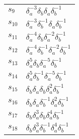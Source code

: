 \documentclass{article}
\begin{document}
\begin{center}
\begin{tabular}{ll}
$s_{9}$ & $\delta_a^{-3}\delta_b^{}\delta_a^{}\delta_b^{-1}$ \\
$s_{10}$ & $\delta_a^{-3}\delta_b^{-1}\delta_a^{}\delta_b^{-1}$ \\
$s_{11}$ & $\delta_a^{-4}\delta_b^{}\delta_a^{-2}\delta_b^{-1}$ \\
$s_{12}$ & $\delta_a^{-4}\delta_b^{-1}\delta_a^{-2}\delta_b^{-1}$ \\
$s_{13}$ & $\delta_a^{5}\delta_b^{}\delta_a^{-5}\delta_b^{-1}$ \\
$s_{14}$ & $\delta_a^{5}\delta_b^{-1}\delta_a^{-5}\delta_b^{-1}$ \\
$s_{15}$ & $\delta_b^{}\delta_a^{}\delta_b^{}\delta_a^{2}\delta_b^{-1}$ \\
$s_{16}$ & $\delta_b^{}\delta_a^{}\delta_b^{-1}\delta_a^{2}\delta_b^{-1}$ \\
$s_{17}$ & $\delta_b^{}\delta_a^{3}\delta_b^{}\delta_a^{4}\delta_b^{-1}$ \\
$s_{18}$ & $\delta_b^{}\delta_a^{3}\delta_b^{-1}\delta_a^{4}\delta_b^{-1}$ \\
\bottomrule
\end{tabular}
\end{center}

\thispagestyle{empty}
\end{document}
